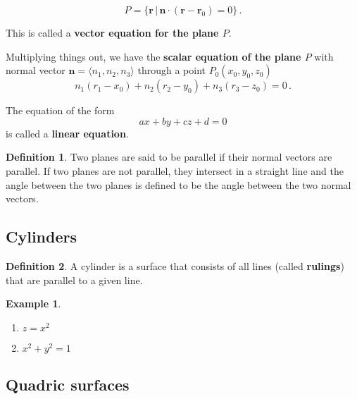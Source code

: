 \documentclass[
]{article}
\providecommand{\tightlist}{%
  \setlength{\itemsep}{0pt}\setlength{\parskip}{0pt}}
\theoremstyle{definition}
\newtheorem{definition}{Definition}[section]
\theoremstyle{definition}
\newtheorem{example}{Example}[section]
\theoremstyle{definition}
\theoremstyle{definition}
\theoremstyle{remark}
\begin{document}
\begin{equation*}
    P = \{ \mathbf{r} \, | \, \mathbf{n} \cdot (\mathbf{r}- \mathbf{r}_0 ) = 0 \} \,.
\end{equation*}

This is called a \textbf{vector equation for the plane \(P\)}.

Multiplying things out, we have the \textbf{scalar equation of the plane \(P\)} with
normal vector \(\mathbf{n} = \langle n_1, n_2, n_3 \rangle\) through a point \(P_0(x_0, y_0, z_0)\)
\begin{equation*}
    n_1(r_1- x_0) + n_2 (r_2 - y_0) + n_3(r_3 - z_0) = 0 \,.
\end{equation*}

The equation of the form
\begin{equation*}
    ax + by + cz + d = 0 
\end{equation*}
is called a \textbf{linear equation}.

\begin{definition}
Two planes are said to be parallel if their normal vectors are parallel.
If two planes are not parallel, they intersect in a straight line and
the angle between the two planes is defined to be the angle between the
two normal vectors.
\end{definition}

\hypertarget{cylinders}{%
\subsection{Cylinders}\label{cylinders}}

\begin{definition}
A cylinder is a surface that consists of all lines (called \textbf{rulings}) that
are parallel to a given line.
\end{definition}

\begin{example}
\leavevmode

\begin{enumerate}
\def\labelenumi{\arabic{enumi}.}
\tightlist
\item
  \(z = x^2\)
\item
  \(x^2 + y^2 = 1\)
\end{enumerate}

\end{example}

\hypertarget{quadric-surfaces}{%
\subsection{Quadric surfaces}\label{quadric-surfaces}}
\end{document}
